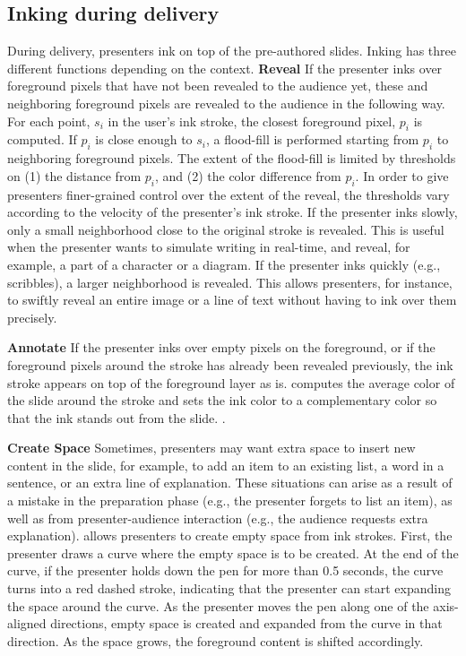 \subsection{Inking during delivery}
During delivery, presenters ink on top of the pre-authored slides. Inking has three different functions depending on the context. 
\textbf{Reveal}
If the presenter inks over  foreground pixels that have not been revealed to the audience yet, these and neighboring foreground pixels are revealed to the audience in the following way. For each point, $s_i$ in the user's ink stroke, the closest foreground pixel, $p_i$ is computed. If $p_i$ is close enough to $s_i$, a flood-fill is performed starting from $p_i$ to neighboring foreground pixels. The extent of the flood-fill is limited by thresholds on (1) the distance from $p_i$, and (2) the color difference from $p_i$. In order to give presenters finer-grained control over the extent of the reveal, the thresholds vary according to the velocity of the presenter's ink stroke. If the presenter inks slowly, only a small neighborhood close to the original stroke is revealed. This is useful when the presenter wants to simulate writing in real-time, and reveal, for example, a part of a character or a diagram. If the presenter inks quickly (e.g., scribbles), a larger neighborhood is revealed. This allows presenters, for instance, to swiftly reveal an entire image or a line of text without having to ink over them precisely.  

\textbf{Annotate}
If the presenter inks over empty pixels on the foreground, or if the foreground pixels around the stroke has already been revealed previously, the ink stroke appears on top of the foreground layer as is. \interface computes the average color of the slide around the stroke and sets the ink color to a complementary color so that the ink stands out from the slide. . 

\textbf{Create Space}
Sometimes, presenters may want extra space to insert new content in the slide, for example, to add an item to an existing list, a word in a sentence, or an extra line of explanation. These situations can arise as a result of a mistake in the preparation phase (e.g., the presenter forgets to list an item), as well as from presenter-audience interaction (e.g., the audience requests extra explanation). \interface allows presenters to create empty space from ink strokes. First, the presenter draws a curve where the empty space is to be created. At the end of the curve, if the presenter holds down the pen for more than 0.5 seconds, the curve turns into a red dashed stroke, indicating that the presenter can start expanding the space around the curve. As the presenter moves the pen along one of the axis-aligned directions, empty space is created and expanded from the curve in that direction.  As the space grows, the foreground content is shifted accordingly. 
